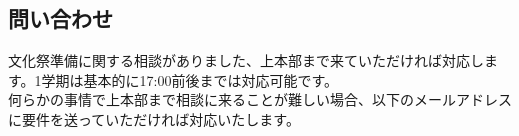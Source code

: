 \begin{multicols*}{2}
\section{問い合わせ}
\indent 文化祭準備に関する相談がありました、上本部まで来ていただければ対応します。1学期は基本的に17:00前後までは対応可能です。\\
\indent 何らかの事情で上本部まで相談に来ることが難しい場合、以下のメールアドレスに要件を送っていただければ対応いたします。

\end{multicols*}
